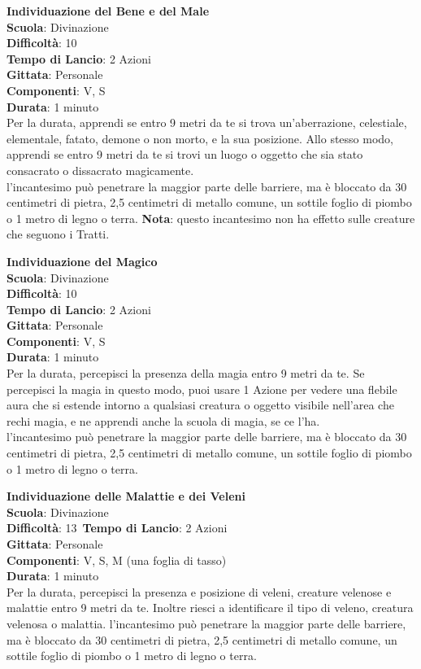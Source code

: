 \begin{multicols}{2}
\medskip\textbf{Individuazione del Bene e del Male}\\
\textbf{Scuola}: Divinazione\\
\textbf{Difficoltà}:  10\\
\textbf{Tempo di Lancio}: 2 Azioni\\
\textbf{Gittata}: Personale\\
\textbf{Componenti}: V, S\\
\textbf{Durata}: 1 minuto\\
Per la durata, apprendi se entro 9 metri da te si trova un'aberrazione, celestiale, elementale, fatato, demone o non morto, e la sua posizione. Allo stesso modo, apprendi se entro 9 metri da te si trovi un luogo o oggetto che sia stato consacrato o dissacrato magicamente.\\
l'incantesimo può penetrare la maggior parte delle barriere, ma è bloccato da 30 centimetri di pietra, 2,5 centimetri di metallo comune, un sottile foglio di piombo o 1 metro di legno o terra. 
\textbf{Nota}: questo incantesimo non ha effetto sulle creature che seguono i Tratti.

\medskip\textbf{Individuazione del Magico}\\
\textbf{Scuola}: Divinazione\\
\textbf{Difficoltà}:  10\\
\textbf{Tempo di Lancio}: 2 Azioni\\
\textbf{Gittata}: Personale\\
\textbf{Componenti}: V, S\\
\textbf{Durata}: 1 minuto\\
Per la durata, percepisci la presenza della magia entro 9 metri da te. Se percepisci la magia in questo modo, puoi usare 1 Azione per vedere una flebile aura che  si estende intorno a qualsiasi creatura o oggetto visibile nell'area che rechi magia, e ne apprendi anche la scuola di magia, se ce l’ha.\\
l'incantesimo può penetrare la maggior parte delle barriere, ma è bloccato da 30 centimetri di pietra, 2,5 centimetri di metallo comune, un sottile foglio di piombo o 1 metro di legno o terra.

\medskip\textbf{Individuazione delle Malattie e dei Veleni}\\
\textbf{Scuola}: Divinazione\\
\textbf{Difficoltà}: 13\
\textbf{Tempo di Lancio}: 2 Azioni\\
\textbf{Gittata}: Personale\\
\textbf{Componenti}: V, S, M (una foglia di tasso)\\
\textbf{Durata}: 1 minuto\\
Per la durata, percepisci la presenza e posizione di veleni, creature velenose e malattie entro 9 metri da te. Inoltre riesci a identificare il tipo di veleno, creatura velenosa o malattia. l'incantesimo può penetrare la maggior parte delle barriere, ma è bloccato da 30 centimetri di pietra, 2,5 centimetri di metallo comune, un sottile foglio di piombo o 1 metro di legno o terra.


\end{multicols}
